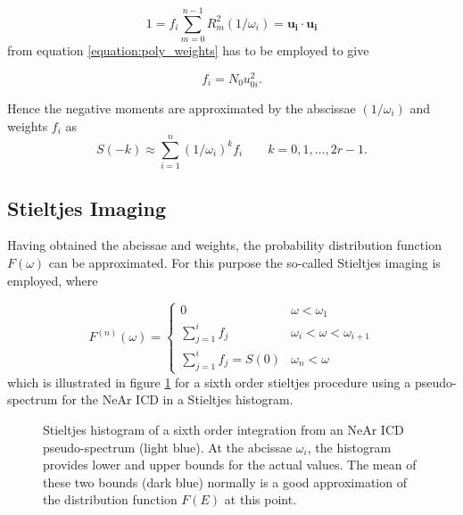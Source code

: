 \begin{equation}
  1 = f_i \sum\limits_{m=0}^{n-1} R_m^2 (1/\omega_i) = \mathbf{u_i} \cdot \mathbf{u_i}
\end{equation}
from equation \ref{equation:poly_weights} has to be employed to give

\begin{equation}
  f_i = N_0 u_{0i}^2 .
\end{equation}

Hence the negative moments are approximated by the abscissae $(1/\omega_i)$ and
weights $f_i$ as
\begin{equation}
  S(-k) \approx \sum\limits_{i=1}^n (1/\omega_i)^k  f_i \quad\quad k=0,1,\dots,2r-1  .
\end{equation}





\subsection{Stieltjes Imaging}
Having obtained the abcissae and weights, the probability distribution function
$F(\omega)$ can be approximated. For this purpose the so-called Stieltjes imaging
is employed, where

\begin{equation}
  F^{(n)} (\omega) =
  \begin{cases}
    0                                & \omega < \omega_1\\
    \sum\limits_{j=1}^{i} f_j        & \omega_i < \omega < \omega_{i+1}\\
    \sum\limits_{j=1}^{i} f_j = S(0) & \omega_n < \omega 
  \end{cases}
\end{equation}
which is illustrated in figure \ref{figure:stieltjes_imaging} for a sixth
order stieltjes procedure using a pseudo-spectrum for the NeAr ICD in a
Stieltjes histogram.


\begin{figure}[h]
  \centering
  
  \caption{Stieltjes histogram of a sixth order integration from
           an NeAr ICD pseudo-spectrum (light blue). At the abcissae $\omega_i$,
           the histogram provides lower and upper bounds for the actual
           values. The mean of these two bounds (dark blue) normally is a good
           approximation of the distribution function $F(E)$ at this point.}
  \label{figure:stieltjes_imaging}
\end{figure}

